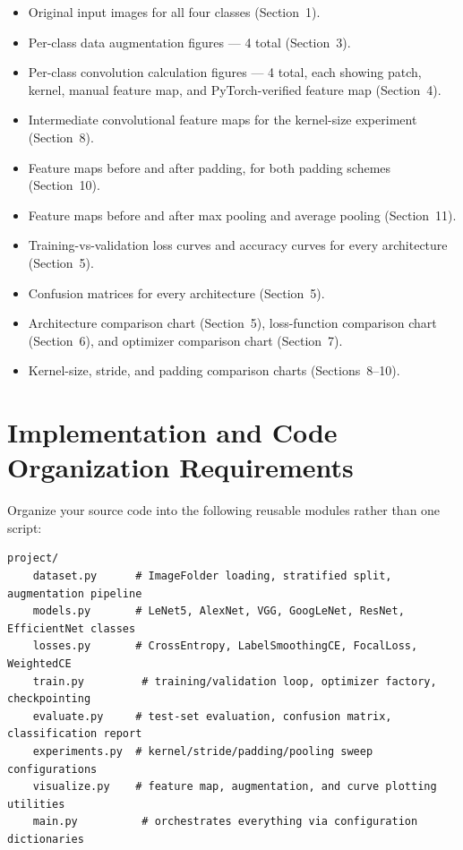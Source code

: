 \documentclass[12pt,a4paper]{article}
\begin{document}
\begin{itemize}[leftmargin=*]
  \item Original input images for all four classes (Section~1).
  \item Per-class data augmentation figures --- 4 total (Section~3).
  \item Per-class convolution calculation figures --- 4 total, each showing patch,
        kernel, manual feature map, and PyTorch-verified feature map (Section~4).
  \item Intermediate convolutional feature maps for the kernel-size experiment (Section~8).
  \item Feature maps before and after padding, for both padding schemes (Section~10).
  \item Feature maps before and after max pooling and average pooling (Section~11).
  \item Training-vs-validation loss curves and accuracy curves for every architecture (Section~5).
  \item Confusion matrices for every architecture (Section~5).
  \item Architecture comparison chart (Section~5), loss-function comparison
        chart (Section~6), and optimizer comparison chart (Section~7).
  \item Kernel-size, stride, and padding comparison charts (Sections~8--10).
\end{itemize}

\section{Implementation and Code Organization Requirements}

\begin{stepbox}
Organize your source code into the following reusable modules rather than one script:
\end{stepbox}

\begin{lstlisting}[style=pythonstyle]
project/
    dataset.py      # ImageFolder loading, stratified split, augmentation pipeline
    models.py       # LeNet5, AlexNet, VGG, GoogLeNet, ResNet, EfficientNet classes
    losses.py       # CrossEntropy, LabelSmoothingCE, FocalLoss, WeightedCE
    train.py         # training/validation loop, optimizer factory, checkpointing
    evaluate.py     # test-set evaluation, confusion matrix, classification report
    experiments.py  # kernel/stride/padding/pooling sweep configurations
    visualize.py    # feature map, augmentation, and curve plotting utilities
    main.py          # orchestrates everything via configuration dictionaries
\end{lstlisting}
\end{document}
